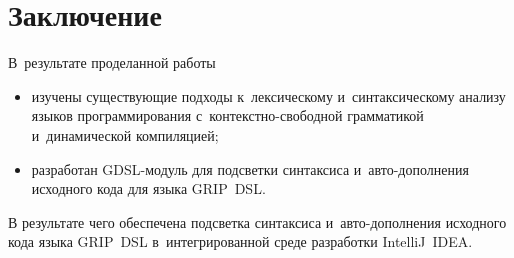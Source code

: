 \chapter*{Заключение}                       %


В~результате проделанной работы 

\begin{itemize} 
	\item{изучены существующие подходы к~лексическому и~синтаксическому анализу языков программирования с~контекстно-свободной грамматикой и~динамической компиляцией;}	
	\item{разработан GDSL-модуль для подсветки синтаксиса и~авто-дополнения исходного кода для языка GRIP~DSL.}
\end{itemize} 

В результате чего обеспечена подсветка синтаксиса и~авто-дополнения исходного кода языка GRIP~DSL в~интегрированной среде разработки IntelliJ~IDEA.
